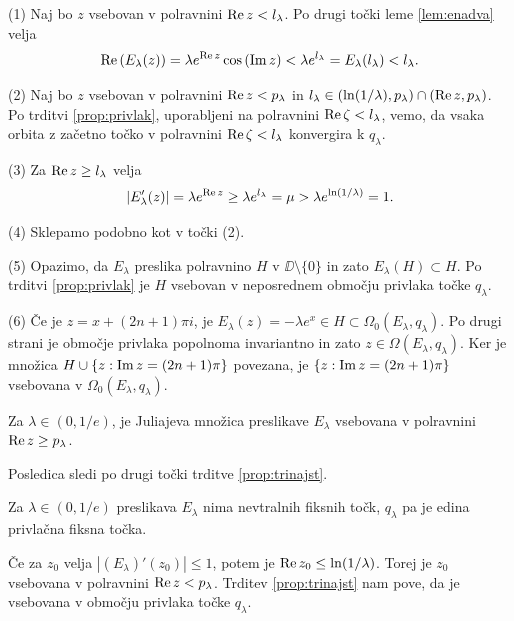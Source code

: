 \begin{dokaz}
    (1) Naj bo \(z\) vsebovan v polravnini \(\operatorname{Re} z < l_\lambda\). Po drugi točki leme \ref{lem:enadva} velja
    \[\operatorname{Re} \left( E_\lambda (z) \right) = \lambda e^{\operatorname{Re} z} \cos \left( \operatorname{Im} z \right) < \lambda e^{l_\lambda} = E_\lambda (l_\lambda) < l_\lambda.\]

    (2) Naj bo \(z\) vsebovan v polravnini \(\operatorname{Re} z < p_\lambda\) in \(l_\lambda \in (\ln (1 / \lambda), p_\lambda) \cap (\operatorname{Re} z, p_\lambda)\). Po trditvi \ref{prop:privlak}, uporabljeni na polravnini \(\operatorname{Re} \zeta < l_\lambda\), vemo, da vsaka orbita z začetno točko v polravnini \(\operatorname{Re} \zeta < l_\lambda\) konvergira k \(q_\lambda\).

    (3) Za \(\operatorname{Re} z \geq l_\lambda\) velja
    \[|E_\lambda' (z)| = \lambda e^{\operatorname{Re} z} \geq \lambda e^{l_\lambda} = \mu > \lambda e^{\ln (1 / \lambda)} = 1.\]

    (4) Sklepamo podobno kot v točki (2).

    (5) Opazimo, da \(E_\lambda\) preslika polravnino \(H\) v \(\DD \setminus \{0\}\) in zato \(E_\lambda (H) \subset H\). Po trditvi \ref{prop:privlak} je \(H\) vsebovan v neposrednem območju privlaka točke \(q_\lambda\).

    (6) Če je \(z = x + (2n + 1) \pi i\), je \(E_\lambda (z) = - \lambda e^x \in H \subset \Omega_0 (E_\lambda, q_\lambda)\). Po drugi strani je območje privlaka popolnoma invariantno in zato \(z \in \Omega (E_\lambda, q_\lambda)\). Ker je množica \(H \cup \left\{ z : \operatorname{Im} z = (2n + 1) \pi \right\}\) povezana, je \(\left\{ z : \operatorname{Im} z = (2n + 1) \pi \right\}\) vsebovana v \(\Omega_0 (E_\lambda, q_\lambda)\).
\end{dokaz}

\begin{posledica} \label{cor:jul-e}
    Za \(\lambda \in (0, 1/e)\), je Juliajeva množica preslikave \(E_\lambda\) vsebovana v polravnini \(\operatorname{Re} z \geq p_\lambda\).
\end{posledica}

\begin{dokaz}
    Posledica sledi po drugi točki trditve \ref{prop:trinajst}.
\end{dokaz}

\begin{posledica}
    Za \(\lambda \in (0, 1/e)\) preslikava \(E_\lambda\) nima nevtralnih fiksnih točk, \(q_\lambda\) pa je edina privlačna fiksna točka.
\end{posledica}

\begin{dokaz}
    Če za \(z_0\) velja \(|(E_\lambda)' (z_0)| \leq 1\), potem je \(\operatorname{Re} z_0 \leq \ln (1 / \lambda)\). Torej je \(z_0\) vsebovana v polravnini \(\operatorname{Re} z < p_\lambda\). Trditev \ref{prop:trinajst} nam pove, da je vsebovana v območju privlaka točke \(q_\lambda\).
\end{dokaz}

